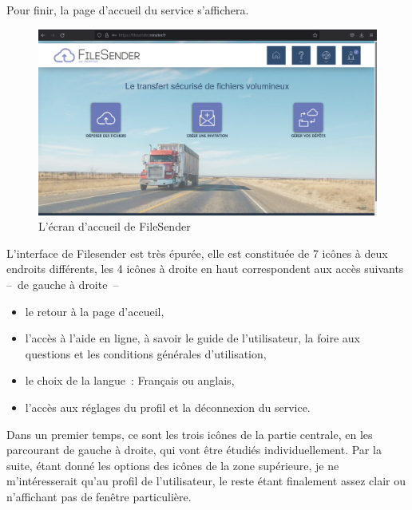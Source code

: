 Pour finir, la page d'accueil du service s'affichera.
\begin{figure}
	\centering
	\includegraphics{./Captures/filesender.homepage.png}
	\caption{L'écran d'accueil de FileSender}
\end{figure}

L'interface de Filesender est très épurée, elle est constituée de 7 icônes à deux endroits différents, les 4 icônes à droite en haut correspondent aux accès suivants --~de gauche à droite~--
\begin{itemize}
	\item le retour à la page d'accueil,
	\item l'accès à l'aide en ligne, à savoir le guide de l'utilisateur, la foire aux questions et les conditions générales d'utilisation,
	\item le choix de la langue~: Français ou anglais,
	\item l'accès aux réglages du profil et la déconnexion du service.
\end{itemize}

Dans un premier temps, ce sont les trois icônes de la partie centrale, en les parcourant de gauche à droite, qui vont être étudiés individuellement. 
Par la suite, étant donné les options des icônes de la zone supérieure, je ne m'intéresserait qu'au profil de l'utilisateur, le reste étant finalement assez clair ou n'affichant pas de fenêtre particulière.



%

%

%

%

%